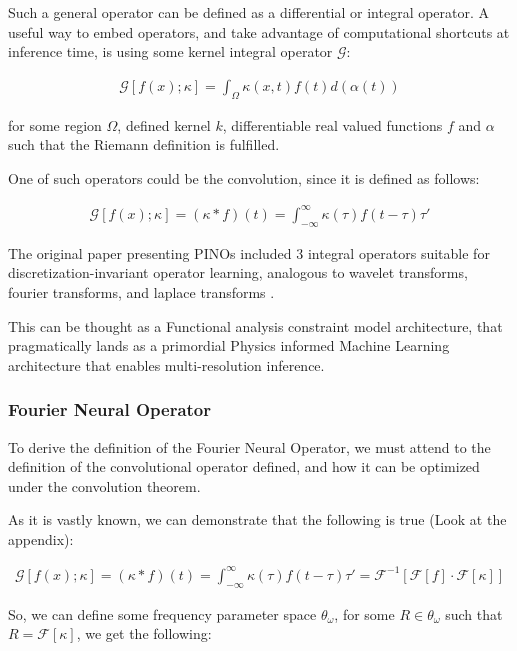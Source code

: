 \documentclass[12pt]{article}
\begin{document}
Such a general operator can be defined as a differential or integral operator. A useful way to embed operators, and take advantage of computational shortcuts at inference time, is using some kernel integral operator $\mathcal{G}$:

\begin{align*}
    \mathcal{G}[f(x); \kappa] = \int_\Omega \kappa(x, t) f(t) d(\alpha(t))
\end{align*}

for some region $\Omega$, defined kernel $k$, differentiable real valued functions $f$ and $\alpha$ such that the Riemann definition is fulfilled.

One of such operators could be the convolution, since it is defined as follows:

\begin{align*}
    \mathcal{G}[ f(x); \kappa ] = (\kappa * f)(t) = \int_{-\infty}^\infty \kappa(\tau)f(t-\tau)\tau'
\end{align*}

The original paper presenting PINOs included 3 integral operators suitable for discretization-invariant operator learning, analogous to wavelet transforms, fourier transforms, and laplace transforms \cite{li2023physicsinformedneuraloperatorlearning}.

This can be thought as a Functional analysis constraint model architecture, that pragmatically lands as a primordial Physics informed Machine Learning architecture that enables multi-resolution inference.

\subsubsection{Fourier Neural Operator}

To derive the definition of the Fourier Neural Operator, we must attend to the definition of the convolutional operator defined, and how it can be optimized under the convolution theorem.

As it is vastly known, we can demonstrate that the following is true (Look at the appendix):

\begin{align*}
    \mathcal{G}[ f(x); \kappa ] = (\kappa * f)(t) = \int_{-\infty}^\infty \kappa(\tau)f(t-\tau)\tau' = \mathcal{F}^{-1}[\mathcal{F}[f] \cdot \mathcal{F}[\kappa]]
\end{align*}

So, we can define some frequency parameter space $\theta_\omega$, for some $R \in \theta_\omega$ such that $R = \mathcal{F}[\kappa]$, we get the following:
\end{document}
